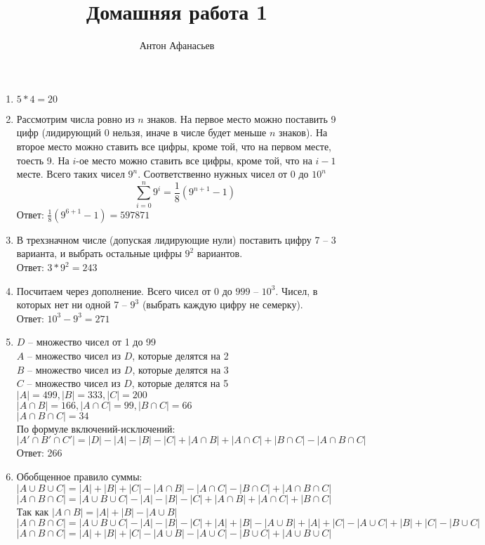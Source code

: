 \documentclass[10pt]{article}
\begin{document}
\title{Домашняя работа 1}
\author{Антон Афанасьев}
\maketitle

\begin{enumerate}[label*=1.\arabic*]
	\item $5*4=20$
	\item Рассмотрим числа ровно из $n$ знаков. На первое место можно поставить 9 цифр (лидирующий 0 нельзя, иначе в числе будет меньше $n$ знаков). На второе место можно ставить все цифры, кроме той, что на первом месте, тоесть 9. На $i$-ое место можно ставить все цифры, кроме той, что на $i-1$ месте. Всего таких чисел $9^n$. Соответственно нужных чисел от $0$ до $10^n$ $$ \sum_{i=0}^n 9^i = \frac{1}{8} (9^{n+1} -1) $$
	Ответ: $\frac{1}{8} (9^{6+1} - 1) = 597871$
	
	\item В трехзначном числе (допуская лидирующие нули) поставить цифру 7 -- 3 варианта, и выбрать остальные цифры $9^2$ вариантов. \\
	Ответ: $3*9^2 = 243$
	
	\item Посчитаем через дополнение. Всего чисел от $0$ до $999$ -- $10^3$. Чисел, в которых нет ни одной 7 -- $9^3$ (выбрать каждую цифру не семерку). \\
	Ответ: $10^3 - 9^3 = 271$
	
	\item $D$ -- множество чисел от 1 до 99\\
	$A$ -- множество чисел из $D$, которые делятся на 2\\
	$B$ -- множество чисел из $D$, которые делятся на 3 \\
	$C$ -- множество чисел из $D$, которые делятся на 5 \\
	$|A| = 499, |B| = 333, |C| = 200$ \\
	$|A \cap B| = 166, |A \cap C| = 99, |B \cap C| = 66$ \\
	$|A \cap B \cap C| = 34$\\
	По формуле включений-исключений:\\
	$|A' \cap B' \cap C'| = |D| - |A| -|B|-|C| + |A \cap B|+|A \cap C| +|B \cap C|-|A \cap B \cap C|$ \\
	Ответ: 266
	
	\item Обобщенное правило суммы:\\
	$|A \cup B \cup C| = |A| + |B| + |C| - |A \cap B| - |A \cap C| - |B \cap C| + |A \cap B \cap C|$\\
	$|A \cap B \cap C| = |A \cup B \cup C|-|A| - |B| - |C| + |A \cap B| + |A \cap C| + |B \cap C|$\\
	Так как $|A \cap B| = |A| + |B| - |A \cup B|$ \\
	$|A \cap B \cap C| = |A \cup B \cup C|-|A| - |B| - |C| + |A| + |B| - |A \cup B| + |A| + |C| - |A \cup C| + |B| + |C| - |B \cup C|$\\
	$|A \cap B \cap C| = |A| + |B| + |C| - |A \cup B|- |A \cup C|- |B \cup C| + |A \cup B \cup C|$
\end{enumerate}
\end{document}
